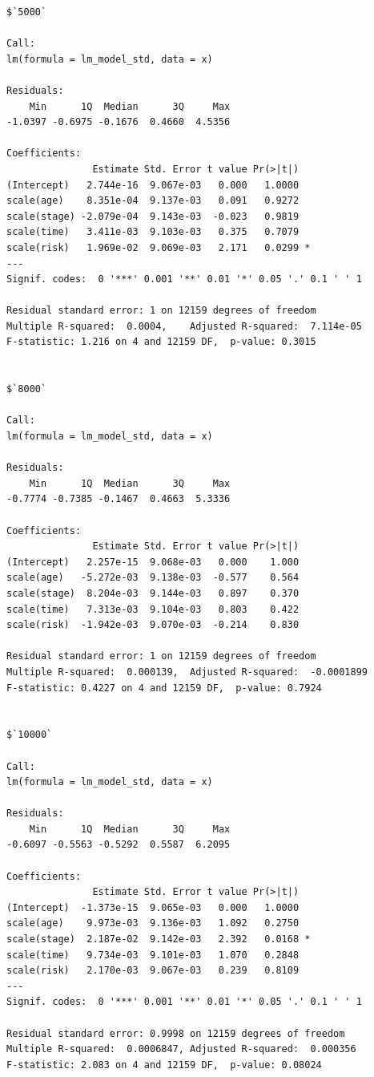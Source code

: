 \documentclass[]{revtex4}\usepackage[]{graphicx}\usepackage[]{color}
\makeatletter
\newenvironment{kframe}{%
 \def\at@end@of@kframe{}%
 \ifinner\ifhmode%
  \def\at@end@of@kframe{\end{minipage}}%
  \begin{minipage}{\columnwidth}%
 \fi\fi%
 \def\FrameCommand##1{\hskip\@totalleftmargin \hskip-\fboxsep
 \colorbox{shadecolor}{##1}\hskip-\fboxsep
     \hskip-\linewidth \hskip-\@totalleftmargin \hskip\columnwidth}%
 \MakeFramed {\advance\hsize-\width
   \@totalleftmargin\z@ \linewidth\hsize
   \@setminipage}}%
 {\par\unskip\endMakeFramed%
 \at@end@of@kframe}
\newenvironment{knitrout}{}{} %
\makeatother
\begin{document}
\begin{knitrout}
\begin{kframe}
\begin{verbatim}
$`5000`

Call:
lm(formula = lm_model_std, data = x)

Residuals:
    Min      1Q  Median      3Q     Max 
-1.0397 -0.6975 -0.1676  0.4660  4.5356 

Coefficients:
               Estimate Std. Error t value Pr(>|t|)  
(Intercept)   2.744e-16  9.067e-03   0.000   1.0000  
scale(age)    8.351e-04  9.137e-03   0.091   0.9272  
scale(stage) -2.079e-04  9.143e-03  -0.023   0.9819  
scale(time)   3.411e-03  9.103e-03   0.375   0.7079  
scale(risk)   1.969e-02  9.069e-03   2.171   0.0299 *
---
Signif. codes:  0 '***' 0.001 '**' 0.01 '*' 0.05 '.' 0.1 ' ' 1

Residual standard error: 1 on 12159 degrees of freedom
Multiple R-squared:  0.0004,	Adjusted R-squared:  7.114e-05 
F-statistic: 1.216 on 4 and 12159 DF,  p-value: 0.3015


$`8000`

Call:
lm(formula = lm_model_std, data = x)

Residuals:
    Min      1Q  Median      3Q     Max 
-0.7774 -0.7385 -0.1467  0.4663  5.3336 

Coefficients:
               Estimate Std. Error t value Pr(>|t|)
(Intercept)   2.257e-15  9.068e-03   0.000    1.000
scale(age)   -5.272e-03  9.138e-03  -0.577    0.564
scale(stage)  8.204e-03  9.144e-03   0.897    0.370
scale(time)   7.313e-03  9.104e-03   0.803    0.422
scale(risk)  -1.942e-03  9.070e-03  -0.214    0.830

Residual standard error: 1 on 12159 degrees of freedom
Multiple R-squared:  0.000139,	Adjusted R-squared:  -0.0001899 
F-statistic: 0.4227 on 4 and 12159 DF,  p-value: 0.7924


$`10000`

Call:
lm(formula = lm_model_std, data = x)

Residuals:
    Min      1Q  Median      3Q     Max 
-0.6097 -0.5563 -0.5292  0.5587  6.2095 

Coefficients:
               Estimate Std. Error t value Pr(>|t|)  
(Intercept)  -1.373e-15  9.065e-03   0.000   1.0000  
scale(age)    9.973e-03  9.136e-03   1.092   0.2750  
scale(stage)  2.187e-02  9.142e-03   2.392   0.0168 *
scale(time)   9.734e-03  9.101e-03   1.070   0.2848  
scale(risk)   2.170e-03  9.067e-03   0.239   0.8109  
---
Signif. codes:  0 '***' 0.001 '**' 0.01 '*' 0.05 '.' 0.1 ' ' 1

Residual standard error: 0.9998 on 12159 degrees of freedom
Multiple R-squared:  0.0006847,	Adjusted R-squared:  0.000356 
F-statistic: 2.083 on 4 and 12159 DF,  p-value: 0.08024
\end{verbatim}
\end{kframe}
\end{knitrout}
\end{document}
